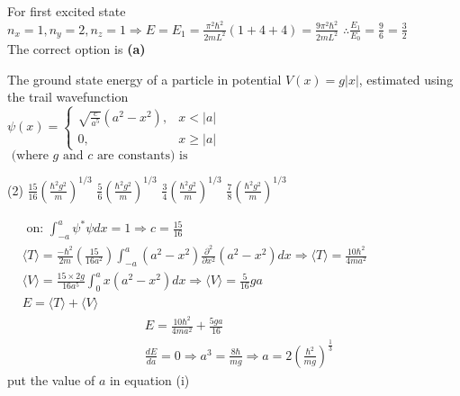 \begin{enumerate}
\begin{answer}
	For first excited state $n_{x}=1, n_{y}=2, n_{z}=1 \Rightarrow E=E_{1}=\frac{\pi^{2} \hbar^{2}}{2 m L^{2}}(1+4+4)=\frac{9 \pi^{2} \hbar^{2}}{2 m L^{2}}$
	$\therefore \frac{E_{1}}{E_{0}}=\frac{9}{6}=\frac{3}{2}$\\
	The correct option is \textbf{(a)}
\end{answer}
\begin{minipage}{\textwidth}
	\item The ground state energy of a particle in potential $V(x)=g|x|$, estimated using the trail wavefunction\\
	$\psi(x)= \begin{cases}\sqrt{\frac{c}{a^{5}}}\left(a^{2}-x^{2}\right), & x<|a| \\ 0, & x \geq|a|\end{cases}$\\
	$\text { (where } g \text { and } c \text { are constants) is }$
\end{minipage}
\begin{tasks}(2)
	\task[\textbf{A.}] $\frac{15}{16}\left(\frac{\hbar^{2} g^{2}}{m}\right)^{1 / 3}$
	\task[\textbf{B.}]$\frac{5}{6}\left(\frac{\hbar^{2} g^{2}}{m}\right)^{1 / 3}$
	\task[\textbf{C.}] $\frac{3}{4}\left(\frac{\hbar^{2} g^{2}}{m}\right)^{1 / 3}$
	\task[\textbf{D.}] $\frac{7}{8}\left(\frac{\hbar^{2} g^{2}}{m}\right)^{1 / 3}$
\end{tasks}
\begin{answer}
	$\begin{aligned}
	&\text { on: } \int_{-a}^{a} \psi^{*} \psi d x=1 \Rightarrow c=\frac{15}{16} \\
	&\langle T\rangle=\frac{-\hbar^{2}}{2 m}\left(\frac{15}{16 a^{2}}\right) \int_{-a}^{a}\left(a^{2}-x^{2}\right) \frac{\partial^{2}}{\partial x^{2}}\left(a^{2}-x^{2}\right) d x \Rightarrow\langle T\rangle=\frac{10 \hbar^{2}}{4 m a^{2}} \\
	&\langle V\rangle=\frac{15 \times 2 g}{16 a^{5}} \int_{0}^{a} x\left(a^{2}-x^{2}\right) d x \Rightarrow\langle V\rangle=\frac{5}{16} g a \\
	&E=\langle T\rangle+\langle V\rangle
	\end{aligned}$
	$$
	\begin{aligned}
	&E=\frac{10 \hbar^{2}}{4 m a^{2}}+\frac{5 g a}{16} \\
	&\frac{d E}{d a}=0 \Rightarrow a^{3}=\frac{8 \hbar}{m g} \Rightarrow a=2\left(\frac{\hbar^{2}}{m g}\right)^{\frac{1}{3}}
	\end{aligned}
	$$
	put the value of $a$ in equation (i)

\end{answer}
\end{enumerate}
